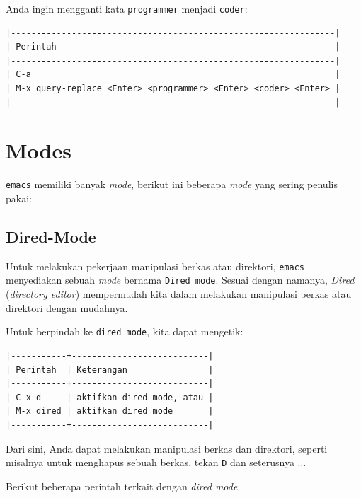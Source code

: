 \documentclass{article}
\begin{document}
Anda ingin mengganti kata \verb=programmer= menjadi \verb=coder=:

\begin{verbatim}
|----------------------------------------------------------------|
| Perintah                                                       |
|----------------------------------------------------------------|
| C-a                                                            |
| M-x query-replace <Enter> <programmer> <Enter> <coder> <Enter> |
|----------------------------------------------------------------|
\end{verbatim}

\section{Modes}
\verb=emacs= memiliki banyak \emph{mode}, berikut ini beberapa \emph{mode} yang sering
penulis pakai:

\subsection{Dired-Mode}
Untuk melakukan pekerjaan manipulasi berkas atau direktori, \verb=emacs=
menyediakan sebuah \emph{mode} bernama \verb=Dired mode=. Sesuai dengan namanya,
\emph{Dired} (\emph{directory editor}) mempermudah kita dalam melakukan manipulasi berkas 
atau direktori dengan mudahnya.

Untuk berpindah ke \verb=dired mode=, kita dapat mengetik:

\begin{verbatim}
|-----------+---------------------------|
| Perintah  | Keterangan                |
|-----------+---------------------------|
| C-x d     | aktifkan dired mode, atau |
| M-x dired | aktifkan dired mode       |
|-----------+---------------------------|
\end{verbatim}

Dari sini, Anda dapat melakukan manipulasi berkas dan direktori, seperti 
misalnya untuk menghapus sebuah berkas, tekan \verb=D= dan seterusnya ...

Berikut beberapa perintah terkait dengan \emph{dired mode}
\end{document}
